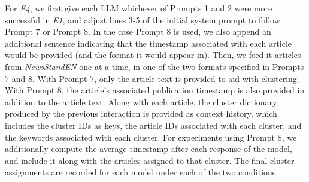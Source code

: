 For \emph{E4}, we first give each LLM whichever of Prompts 1 and 2 were more successful in \emph{E1}, and adjust lines 3-5 of the initial system prompt to follow Prompt 7 or Prompt 8.
In the case Prompt 8 is used, we also append an additional sentence indicating that the timestamp associated with each article would be provided (and the format it would appear in).
Then, we feed it articles from \emph{NewsStandEN} one at a time, in one of the two formats specified in Prompts 7 and 8. 
With Prompt 7, only the article text is provided to aid with clustering.
With Prompt 8, the article's associated publication timestamp is also provided in addition to the article text.
Along with each article, the cluster dictionary produced by the previous interaction is provided as context history, which includes the cluster IDs as keys, the article IDs associated with each cluster, and the keywords associated with each cluster.
For experiments using Prompt 8, we additionally compute the average timestamp after each response of the model, and include it along with the articles assigned to that cluster.
The final cluster assignments are recorded for each model under each of the two conditions.



